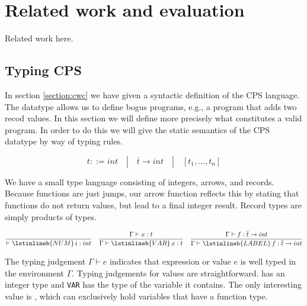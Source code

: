 
\chapter{\label{chap:related-work}Related work and evaluation}

Related work here.

\section{\label{section:cpstype}Typing CPS}
In section \ref{section:cwc} we have given a syntactic definition of the \ac{CPS} language. The datatype allows us to define bogus programs, e.g., a program that adds two recod values. In this section we will define more precisely what constitutes a valid program. In order to do this we will give the static semantics of the \ac{CPS} datatype by way of typing rules\autocite{DBLP:conf/popl/MorrisettWCG98, DBLP:conf/pldi/Chlipala07}.

\begin{equation*}
t ::= int \quad | \quad \overline{t} \to int \quad | \quad [t_1, \dots, t_n]
\end{equation*}

We have a small type language consisting of integers, arrows, and records. Because functions are just jumps, our arrow function reflects this by stating that functions do not return values, but lead to a final integer result. Record types are simply products of types.

\begin{equation*}
\frac{}{\vdash \lstinlineb{NUM} \, i : int} \quad \frac{\Gamma \vdash x : t}{\Gamma \vdash \lstinlineb{VAR} \, x : t} \quad \frac{\Gamma \vdash f : \overline{t} \to int}{\Gamma \vdash \lstinlineb{LABEL} \, f : \overline{t} \to int}
\end{equation*}

The typing judgement $\Gamma \vdash e$ indicates that expression or value $e$ is well typed in the environment $\Gamma$. Typing judgements for values are straightforward.  has an integer type and \lstinline{VAR} has the type of the variable it contains. The only interesting value is , which can exclusively hold variables that have a function type.

